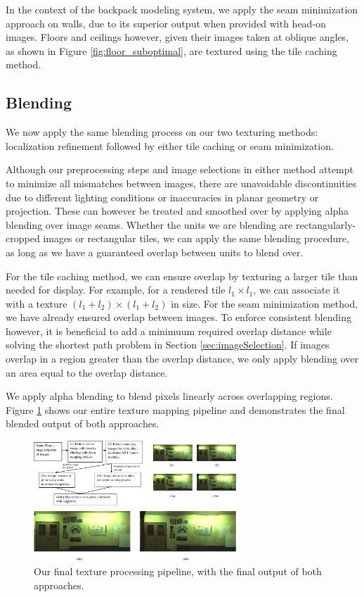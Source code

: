 \documentclass[10pt,twocolumn,letterpaper]{article}
\begin{document}
In the context of the backpack modeling system, we apply the seam
minimization approach on walls, due to its superior output when
provided with head-on images. Floors and ceilings however, given their
images taken at oblique angles, as shown in Figure \ref{fig:floor_suboptimal}, are textured using the tile caching method.

\subsection{Blending}
\label{sec:blending}
We now apply the same blending process on our two texturing methods:
localization refinement followed by either tile caching or seam
minimization.

Although our preprocessing steps and image selections in either method
attempt to minimize all mismatches between images, there are
unavoidable discontinuities due to different lighting conditions or
inaccuracies in planar geometry or projection. These can however be
treated and smoothed over by applying alpha blending over image seams.
Whether the units we are blending are rectangularly-cropped images or
rectangular tiles, we can apply the same blending procedure, as long
as we have a guaranteed overlap between units to blend over.

For the tile caching method, we can ensure overlap by texturing a
larger tile than needed for display. For example, for a rendered tile
$l_1 \times l_1$, we can associate it with a texture $(l_1 + l_2)
\times (l_1 + l_2)$ in size. For the seam minimization method, we have
already ensured overlap between images. To enforce consistent blending
however, it is beneficial to add a minimuum required overlap distance
while solving the shortest path problem in Section
\ref{sec:imageSelection}. If images overlap in a region greater than
the overlap distance, we only apply blending over an area equal to the
overlap distance.

We apply alpha blending to blend pixels
linearly across overlapping regions. Figure
\ref{fig:pipeline} shows our entire texture mapping pipeline and demonstrates the
final blended output of both approaches.

\begin{figure}
  \centering
  \includegraphics[width=3in]{pipeline.pdf}
  \caption{Our final texture processing pipeline, with the final
    output of both approaches.}
  \label{fig:pipeline}
\end{figure}
\end{document}
